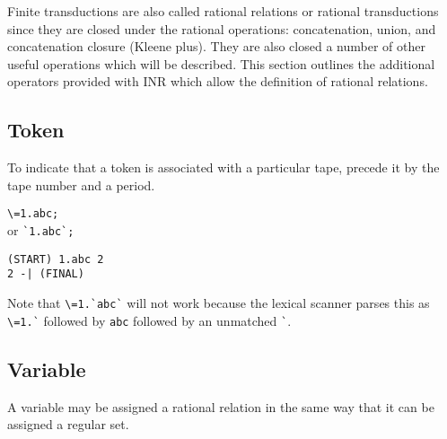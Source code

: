 Finite transductions are also called rational relations or rational
transductions since they are closed under the rational operations:
concatenation, union, and concatenation closure (Kleene plus).
They are also closed a number of other useful operations which will be
described.
This section outlines the additional operators provided with INR which
allow the definition of rational relations.

\subsection{Token}
To indicate that a token is associated with a particular tape, precede it
by the tape number and a period.
\begin{center}\begin{minipage}[t]{3in}\begin{minipage}[t]{3in}\begin{tabbing}
\qquad \= \verb#\=1.abc;#\\
or \> \verb#`1.abc`;#
\end{tabbing}\end{minipage}\end{minipage}
\begin{minipage}[t]{1.6in}\begin{verbatim}
(START) 1.abc 2
2 -| (FINAL)
\end{verbatim}\end{minipage}\end{center}
Note that \verb#\=1.`abc`# will not work because the lexical scanner parses
this as \verb#\=1.`# followed by \verb#abc# followed by an unmatched
\verb#`#.

\subsection{Variable}
A variable may be assigned a rational relation in the same way that it can
be assigned a regular set.

